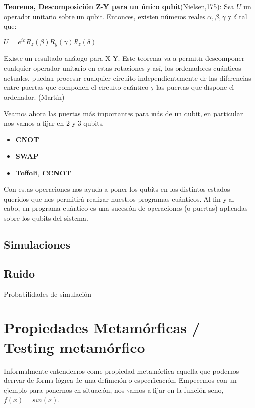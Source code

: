  \textbf{Teorema, Descomposición Z-Y para un único qubit}(Nielsen,175): Sea $U$ un operador unitario sobre un qubit. Entonces, existen números reales $\alpha,\beta,\gamma$ y $\delta$ tal que:
 \begin{center}
     $U = e^{i\alpha} R_{z}(\beta)R_{y}(\gamma)R_{z}(\delta)$
 \end{center}

 Existe un resultado análogo para X-Y. Este teorema va a permitir descomponer cualquier operador unitario en estas rotaciones y así, los ordenadores cuánticos actuales, puedan procesar cualquier circuito independientemente de las diferencias entre puertas que componen el circuito cuántico y las puertas que dispone el ordenador. (Martín) \newline

 Veamos ahora las puertas más importantes para más de un qubit, en particular nos vamos a fijar en 2 y 3 qubits.

 \begin{itemize}
     \item \textbf{CNOT}
     \item \textbf{SWAP}
     \item \textbf{Toffoli, CCNOT}
 \end{itemize}

 \vspace{20pt}
 Con estas operaciones nos ayuda a poner los qubits en los distintos estados queridos que nos permitirá realizar nuestros programas cuánticos. Al fin y al cabo, un programa cuántico es una sucesión de operaciones (o puertas) aplicadas sobre los qubits del sistema. \newline

\subsection{Simulaciones}

\subsection{Ruido}
Probabilidades de simulación

\section{Propiedades Metamórficas / Testing metamórfico}

Informalmente entendemos como propiedad metamórfica aquella que podemos derivar de forma lógica de una definición o especificación. Empecemos con un ejemplo para ponernos en situación, nos vamos a fijar en la función seno, $f(x)=sin(x)$.\newline

